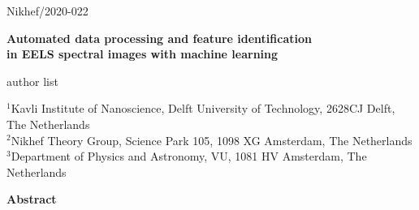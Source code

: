 \documentclass[12pt,a4paper]{article}
\numberwithin{equation}{section}
\numberwithin{figure}{section}
\numberwithin{table}{section}
\begin{document}





\begin{flushright}
Nikhef/2020-022\\
\end{flushright}
\vspace{0.3cm}

\begin{center}
  {\Large \bf Automated data processing and feature identification\\[0.3cm] in
    EELS spectral images with machine learning}
\vspace{1.4cm}


author list

\vspace{1.0cm}
 
{\it \small

$^{1}$Kavli Institute of Nanoscience, Delft University of Technology, 2628CJ Delft, The
  Netherlands\\[0.1cm]
$^{2}$Nikhef Theory Group, Science Park 105, 1098 XG Amsterdam, The
  Netherlands \\[0.1cm]$^{3}$Department of Physics and Astronomy, VU,
    1081 HV Amsterdam, The Netherlands

}

\vspace{1.0cm}

{\bf \large Abstract}

\end{center}
\end{document}
